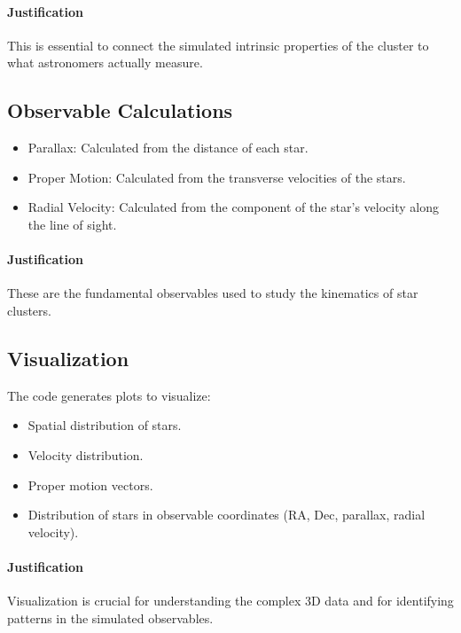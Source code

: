 \documentclass{article}
\begin{document}
	\paragraph{Justification}
	
	This is essential to connect the simulated intrinsic properties of the cluster to what astronomers actually measure.
	
	\subsection{Observable Calculations}
	
	\begin{itemize}
		\item Parallax: Calculated from the distance of each star. 
		\item Proper Motion: Calculated from the transverse velocities of the stars. 
		\item Radial Velocity: Calculated from the component of the star's velocity along the line of sight. 
	\end{itemize}
	
	\paragraph{Justification}
	
	These are the fundamental observables used to study the kinematics of star clusters.
	
	\subsection{Visualization}
	
	The code generates plots to visualize: 
	
	\begin{itemize}
		\item Spatial distribution of stars. 
		\item Velocity distribution. 
		\item Proper motion vectors. 
		\item Distribution of stars in observable coordinates (RA, Dec, parallax, radial velocity). 
	\end{itemize}
	
	\paragraph{Justification}
	
	Visualization is crucial for understanding the complex 3D data and for identifying patterns in the simulated observables.
	
\end{document}
